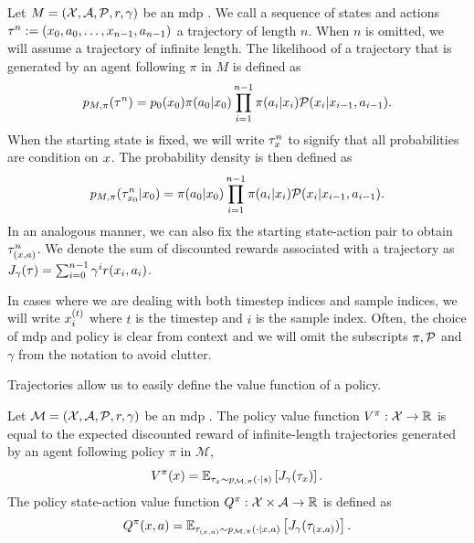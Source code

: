 \begin{definition}[Trajectories]
    Let $M = (\states,\actions,\mathcal{P},r,\gamma)$ be an \ac{mdp}  .
    We call a sequence of states and actions $\tau^n := (\state_0,a_0,\dots,\state_{n-1},a_{n-1})$ a trajectory of length $n$.
    When $n$ is omitted, we will assume a trajectory of infinite length.
    The likelihood of a trajectory that is generated by an agent following $\pi$ in $M$ is defined as $$p_{M, \pi}(\tau^n) = p_0(\state_0) \pi(a_0|\state_0) \prod_{i=1}^{n-1} \pi(a_i|\state_i) \mathcal{P}(\state_i|\state_{i-1},a_{i-1}).$$
    When the starting state is fixed, we will write $\tau^n_\state$ to signify that all probabilities are condition on $\state$. 
    The probability density is then defined as $$p_{M,\pi}(\tau^n_{\state_0}|\state_0) = \pi(a_0|\state_0) \prod_{i=1}^{n-1} \pi(a_i|\state_i) \mathcal{P}(\state_i|\state_{i-1},a_{i-1}).$$
    In an analogous manner, we can also fix the starting state-action pair to obtain $\tau^n_{(\state,a)}$.
    We denote the sum of discounted rewards associated with a trajectory as $J_\gamma(\tau) = \sum_{i=0}^{n-1} \gamma^i r(\state_i,a_i)$.
\end{definition}

In cases where we are dealing with both timestep indices and sample indices, we will write $\state^{(t)}_i$ where $t$ is the timestep and $i$ is the sample index.
Often, the choice of \ac{mdp}  and policy is clear from context and we will omit the subscripts $\pi,\P$ and $\gamma$ from the notation to avoid clutter.

Trajectories allow us to easily define the value function of a policy.

\begin{definition}
    Let $\mathcal{M} = (\states,\actions,\mathcal{P},r,\gamma)$ be an \ac{mdp}  .
    The policy value function $V^\pi: \states \rightarrow \mathbb{R}$ is equal to the expected discounted reward of infinite-length trajectories generated by an agent following policy $\pi$ in $\mathcal{M}$, $$V^\pi(\state) = \mathbb{E}_{\tau_\state \sim p_{\mathcal{M},\pi}(\cdot|s)} \left[ J_\gamma(\tau_\state)\right].$$
    The policy state-action value function $Q^\pi: \states \times \actions \rightarrow \mathbb{R}$ is defined as $$Q^\pi(\state,a) = \mathbb{E}_{\tau_{(\state,a)} \sim p_{\mathcal{M},\pi}(\cdot|\state,a)} \left[ J_\gamma(\tau_{(\state,a)})\right].$$
\end{definition}

